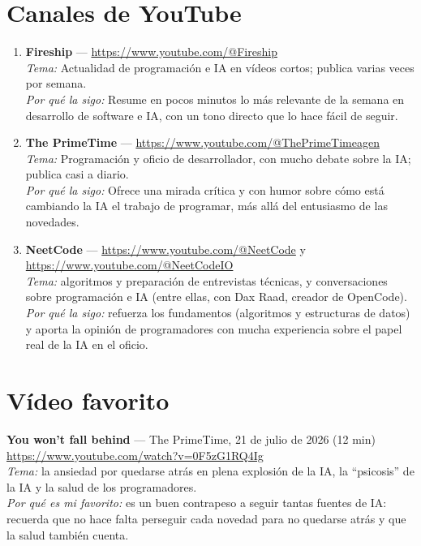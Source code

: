 \documentclass[11pt,a4paper]{article}
\newcommand{\fuente}[4]{\item \textbf{#1} --- \url{#2} \\ \textit{Tema:} #3 \\ \textit{Por qué la sigo:} #4}
\begin{document}
	\section{Canales de YouTube}
	\begin{enumerate}[resume, itemsep=8pt]
		\fuente{Fireship}{https://www.youtube.com/@Fireship}{Actualidad de programación e IA en vídeos cortos; publica varias veces por semana.}{Resume en pocos minutos lo más relevante de la semana en desarrollo de software e IA, con un tono directo que lo hace fácil de seguir.}
		\fuente{The PrimeTime}{https://www.youtube.com/@ThePrimeTimeagen}{Programación y oficio de desarrollador, con mucho debate sobre la IA; publica casi a diario.}{Ofrece una mirada crítica y con humor sobre cómo está cambiando la IA el trabajo de programar, más allá del entusiasmo de las novedades.}
		\item \textbf{NeetCode} --- \url{https://www.youtube.com/@NeetCode} y \url{https://www.youtube.com/@NeetCodeIO} \\
		\textit{Tema:} algoritmos y preparación de entrevistas técnicas, y conversaciones sobre programación e IA (entre ellas, con Dax Raad, creador de OpenCode). \\
		\textit{Por qué la sigo:} refuerza los fundamentos (algoritmos y estructuras de datos) y aporta la opinión de programadores con mucha experiencia sobre el papel real de la IA en el oficio.
	\end{enumerate}

	\section{Vídeo favorito}
	\textbf{You won't fall behind} --- The PrimeTime, 21 de julio de 2026 (12 min) \\
	\url{https://www.youtube.com/watch?v=0F5zG1RQ4Ig} \\
	\textit{Tema:} la ansiedad por quedarse atrás en plena explosión de la IA, la ``psicosis'' de la IA y la salud de los programadores. \\
	\textit{Por qué es mi favorito:} es un buen contrapeso a seguir tantas fuentes de IA: recuerda que no hace falta perseguir cada novedad para no quedarse atrás y que la salud también cuenta.
\end{document}
